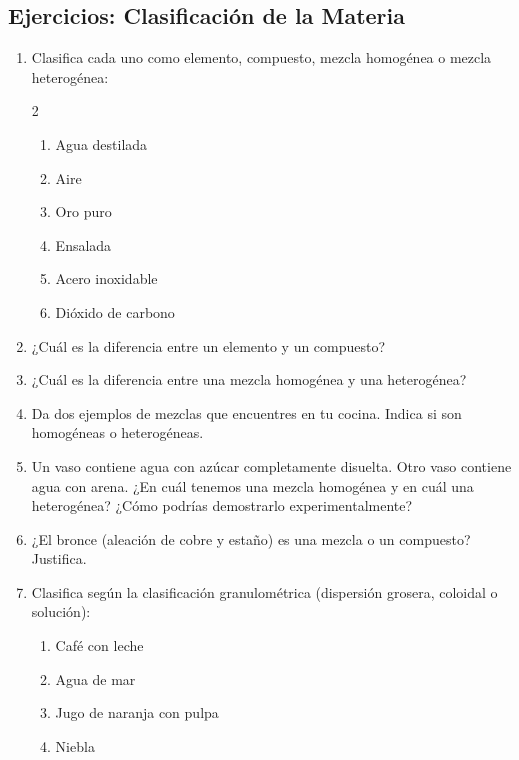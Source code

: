 \documentclass[12pt, letterpaper]{article}
\begin{document}

\subsection{Ejercicios: Clasificación de la Materia}

\begin{enumerate}[leftmargin=*, resume]
  \item \facil{} Clasifica cada uno como elemento, compuesto, mezcla homogénea o mezcla heterogénea:
        \begin{multicols}{2}
          \begin{enumerate}[label=\alph*)]
            \item Agua destilada
            \item Aire
            \item Oro puro
            \item Ensalada
            \item Acero inoxidable
            \item Dióxido de carbono
          \end{enumerate}
        \end{multicols}

  \item \facil{} ¿Cuál es la diferencia entre un elemento y un compuesto?

  \item \facil{} ¿Cuál es la diferencia entre una mezcla homogénea y una heterogénea?

  \item \facil{} Da dos ejemplos de mezclas que encuentres en tu cocina. Indica si son homogéneas o heterogéneas.

  \item \medio{} Un vaso contiene agua con azúcar completamente disuelta. Otro vaso contiene agua con arena. ¿En cuál tenemos una mezcla homogénea y en cuál una heterogénea? ¿Cómo podrías demostrarlo experimentalmente?

  \item \medio{} ¿El bronce (aleación de cobre y estaño) es una mezcla o un compuesto? Justifica.

  \item \medio{} Clasifica según la clasificación granulométrica (dispersión grosera, coloidal o solución):
        \begin{enumerate}[label=\alph*)]
          \item Café con leche
          \item Agua de mar
          \item Jugo de naranja con pulpa
          \item Niebla
        \end{enumerate}


\end{enumerate}
\end{document}

